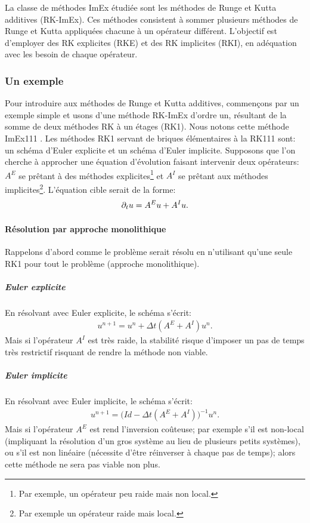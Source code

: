 La classe de méthodes ImEx étudiée sont les méthodes de Runge et Kutta additives (RK-ImEx).
Ces méthodes consistent à sommer plusieurs méthodes de Runge et Kutta appliquées chacune à un opérateur différent.
L'objectif est d'employer des RK explicites (RKE) et des RK implicites (RKI), en adéquation avec les besoin de chaque opérateur.
\subsubsection{Un exemple}
    Pour introduire aux méthodes de Runge et Kutta additives, commençons par un exemple simple et usons d'une méthode RK-ImEx
    d'ordre un, résultant de la somme de deux méthodes RK à un étages (RK1). Nous notons cette méthode ImEx111 \cite{ASCHER1997151}. 
    Les méthodes RK1 servant de briques élémentaires à la RK111 sont: un schéma d'Euler explicite et un schéma d'Euler implicite.
    Supposons que l'on cherche à approcher une équation d'évolution faisant intervenir deux opérateurs: $A^E$ se prêtant à des méthodes explicites\footnote{Par exemple, un opérateur peu raide mais non local.}
    et $A^I$ se prêtant aux méthodes implicites\footnote{Par exemple un opérateur raide mais local.}. L'équation cible serait de la forme: 
    \begin{align}
        \partial_t u = A^E u + A^I u.
    \end{align}
    \paragraph{Résolution par approche monolithique}
        Rappelons d'abord comme le problème serait résolu en n'utilisant qu'une seule RK1 pour tout le problème (approche monolithique).
        \subparagraph{Euler explicite}
            En résolvant avec Euler explicite, le schéma s'écrit: 
            \begin{align}
                u^{n+1} = u^n + \Delta t (A^E + A^I) u^n.
            \end{align}
            Mais si l'opérateur $A^I$ est très raide, la stabilité risque d'imposer un pas de temps très restrictif risquant de rendre la méthode non viable.
        \subparagraph{Euler implicite}
            En résolvant avec Euler implicite, le schéma s'écrit:
            \begin{align}
                u^{n+1} = \bigl(Id - \Delta t (A^E + A^I)\bigr)^{-1} u^n.
            \end{align}
            Mais si l'opérateur $A^E$ est rend l'inversion coûteuse;
            par exemple s'il est non-local (impliquant la résolution d'un gros système au lieu de plusieurs petits systèmes), 
            ou s'il est non linéaire (nécessite d'être réinverser à chaque pas de temps);
            alors cette méthode ne sera pas viable non plus.
